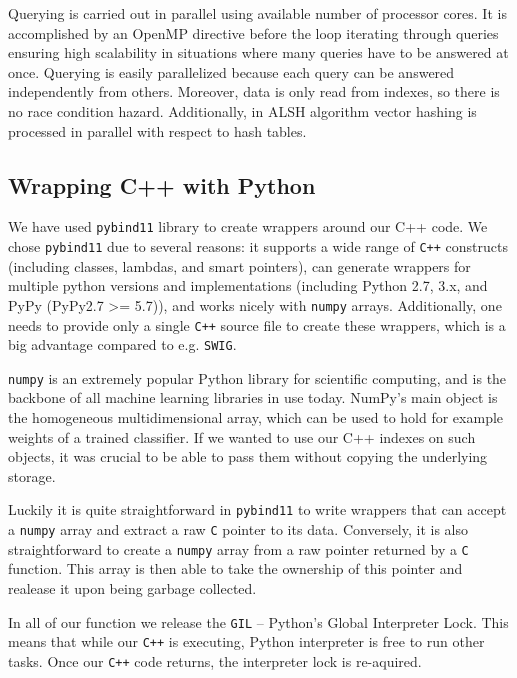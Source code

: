 Querying is carried out in parallel using available number of processor cores.
It is accomplished by an OpenMP directive
before the loop iterating through queries ensuring high scalability in situations
where many queries have to be answered at once.
Querying is easily parallelized because each query can be answered independently from others.
Moreover, data is only read from indexes, so there is no race condition hazard.
Additionally, in ALSH algorithm vector hashing is processed in parallel with respect to hash tables.

\subsection{Wrapping C++ with Python}

We have used \texttt{pybind11}\cite{pybind11} library to create wrappers around our C++ code. We chose \texttt{pybind11}
due to several reasons: it supports a wide range of \texttt{C++} constructs
(including classes, lambdas, and smart pointers), can generate wrappers for multiple python versions and
implementations (including Python 2.7, 3.x, and PyPy (PyPy2.7 >= 5.7)), and works nicely with \texttt{numpy} arrays.
Additionally, one needs to provide only a single \texttt{C++} source file to create these wrappers, which is
a big advantage compared to e.g. \texttt{SWIG}.

\texttt{numpy} is an extremely popular Python library for scientific computing, and is the backbone of all
machine learning libraries in use today. NumPy’s main object is the homogeneous multidimensional array, which
can be used to hold for example weights of a trained classifier. If we wanted to use our C++ indexes on such
objects, it was crucial to be able to pass them without copying the underlying storage.

Luckily it is quite straightforward in \texttt{pybind11} to write wrappers that can accept a \texttt{numpy} array
and extract a raw \texttt{C} pointer to its data. Conversely, it is also straightforward to create
a \texttt{numpy} array from a raw pointer returned by a \texttt{C} function. This array is then able to take the
ownership of this pointer and realease it upon being garbage collected.

In all of our function we release the \texttt{GIL} -- Python's Global Interpreter Lock. This means that while our
\texttt{C++} is executing, Python interpreter is free to run other tasks. Once our \texttt{C++} code returns, the
interpreter lock is re-aquired.

